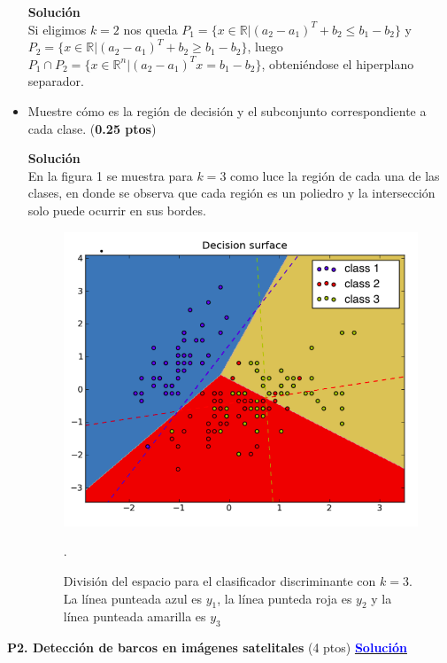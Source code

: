 \documentclass[11pt,letterpaper]{article}
\begin{document}
\begin{itemize}
    \textbf{Solución}\\
    
    Si eligimos $k=2$ nos queda $P_{1} = \{x\in \mathbb{R}|(a_{2}-a_{1})^{T}+b_{2}\leq b_{1}-b_{2}\}$ y $P_{2} = \{x\in \mathbb{R}|(a_{2}-a_{1})^{T}+b_{2}\geq b_{1}-b_{2}\}$, luego $P_{1}\cap P_{2}=\{x\in \mathbb{R}^{n}|(a_{2}-a_{1})^{T}x=b_{1}-b_{2}\}$, obteniéndose el hiperplano separador. 
    \item Muestre cómo es la región de decisión y el subconjunto correspondiente a cada clase. (\textbf{0.25 ptos})
    
    \textbf{Solución}\\
    
    En la figura 1 se muestra para $k=3$ como luce la región de cada una de las clases, en donde se observa que cada región es un poliedro y la intersección solo puede ocurrir en sus bordes.
    
    \begin{figure}[H]
    \center
    \includegraphics[scale=0.25]{img/multiclass.png}
    \caption{División del espacio para el clasificador discriminante con $k=3$. La línea punteada azul es $y_{1}$, la línea punteda roja es $y_{2}$ y la línea punteada amarilla es $y_{3}$}.
\end{figure}
\end{itemize}


\newpage
\noindent\textbf{P2. Detección de barcos en imágenes satelitales} (4 ptos) \href{https://nbviewer.jupyter.org/github/dgarridoa/T3ML/blob/master/solucion.ipynb}{\textcolor{blue}{\textbf{Solución}}}
\vspace{5mm}
\end{document}
